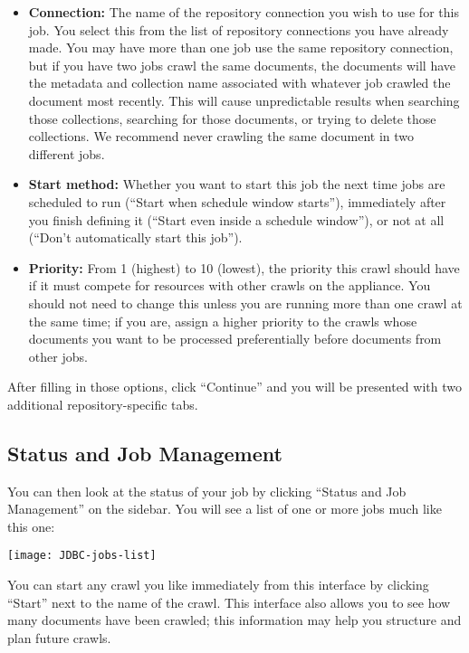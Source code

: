 \begin{changemargin}{1.5in}{0in}
\begin{itemize}

\item \textbf{Connection:} The name of the repository connection you
wish to use for this job. You select this from the list of repository
connections you have already made. You may have more than one job use
the same repository connection, but if you have two jobs crawl the same
documents, the documents will have the metadata and collection name
associated with whatever job crawled the document most recently. This
will cause unpredictable results when searching those collections,
searching for those documents, or trying to delete those collections.
We recommend never crawling the same document in two different jobs.

\item \textbf{Start method:} Whether you want to start this job the next
time jobs are scheduled to run (``Start when schedule window starts''),
immediately after you finish defining it (``Start even inside a schedule
window''), or not at all (``Don't automatically start this job'').

\item \textbf{Priority:} From 1 (highest) to 10 (lowest), the priority
this crawl should have if it must compete for resources with other
crawls on the appliance. You should not need to change this unless you
are running more than one crawl at the same time; if you are, assign a
higher priority to the crawls whose documents you want to be processed
preferentially before documents from other jobs.

\end{itemize}

After filling in those options, click ``Continue'' and you will be
presented with two additional repository-specific tabs.



\subsection{\label{ManageJobs}Status and Job Management}

You can then look at the status of your job by clicking ``Status and 
Job Management'' on the sidebar. You will see a list of one or more jobs
much like this one:

\texttt{[image: JDBC-jobs-list]}

You can start any crawl you like immediately from this interface by
clicking ``Start'' next to the name of the crawl. This interface also
allows you to see how many documents have been crawled; this information
may help you structure and plan future crawls.


\end{changemargin}
